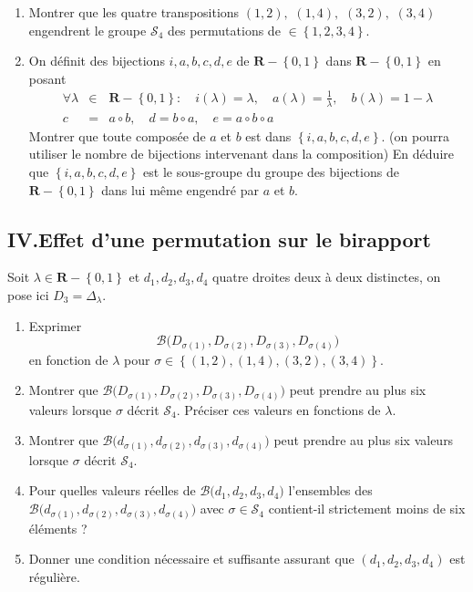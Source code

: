 \begin{enumerate}
\item  Montrer que les quatre transpositions $(1,2),$ $(1,4),$ $(3,2),$ $%
(3,4)$ engendrent le groupe $\mathcal{S}_{4}$ des permutations de $\in
\left\{ 1,2,3,4\right\} $.

\item  On d{\'e}finit des bijections $i,a,b,c,d,e$ de $\mathbf{R-}\left\{
0,1\right\} $ dans $\mathbf{R-}\left\{ 0,1\right\} $ en posant
\begin{eqnarray*}
\forall \lambda  &\in &\mathbf{R-}\left\{ 0,1\right\} :\quad i(\lambda
)=\lambda ,\quad a(\lambda )=\frac{1}{\lambda },\quad b(\lambda )=1-\lambda
\\
c &=&a\circ b,\quad d=b\circ a,\quad e=a\circ b\circ a
\end{eqnarray*}
Montrer que toute compos{\'e}e de $a$ et $b$ est dans $\left\{
i,a,b,c,d,e\right\} .$ (on pourra utiliser le nombre de bijections
intervenant dans la composition)\newline
En d{\'e}duire que $\left\{ i,a,b,c,d,e\right\} $ est le sous-groupe du
groupe des bijections de $\mathbf{R-}\left\{ 0,1\right\} $ dans lui m{\^e}me
engendr{\'e} par $a$ et $b$.
\end{enumerate}

\subsection*{IV.\qquad Effet d'une permutation sur le birapport}

Soit $\lambda \in \mathbf{R-}\left\{ 0,1\right\} $ et $%
d_{1},d_{2},d_{3},d_{4}$ quatre droites deux {\`a} deux distinctes, on pose
ici $D_{3}=\Delta _{\lambda }$.

\begin{enumerate}
\item  Exprimer
\begin{displaymath}
\mathcal{B(}D_{\sigma (1)},D_{\sigma (2)},D_{\sigma (3)},D_{\sigma (4)}) 
\end{displaymath}
en fonction de $\lambda $ pour $\sigma \in \left\{(1,2),(1,4),(3,2),(3,4)\right\} $.

\item  Montrer que $\mathcal{B(}D_{\sigma (1)},D_{\sigma (2)},D_{\sigma
(3)},D_{\sigma (4)})$ peut prendre au plus six valeurs lorsque $\sigma $
d{\'e}crit $\mathcal{S}_{4}$. Pr{\'e}ciser ces valeurs en fonctions de $%
\lambda $.

\item  Montrer que $\mathcal{B(}d_{\sigma (1)},d_{\sigma (2)},d_{\sigma
(3)},d_{\sigma (4)})$ peut prendre au plus six valeurs lorsque $\sigma $
d{\'e}crit $\mathcal{S}_{4}$.

\item  Pour quelles valeurs r{\'e}elles de $\mathcal{B(}%
d_{1},d_{2},d_{3},d_{4})$ l'ensembles des $\mathcal{B(}d_{\sigma
(1)},d_{\sigma (2)},d_{\sigma (3)},d_{\sigma (4)})$ avec $\sigma \in
\mathcal{S}_{4}$ contient-il strictement moins de six {\'e}l{\'e}ments ?

\item  Donner une condition n{\'e}cessaire et suffisante assurant que $%
(d_{1},d_{2},d_{3},d_{4})$ est r{\'e}guli{\`e}re.
\end{enumerate}
